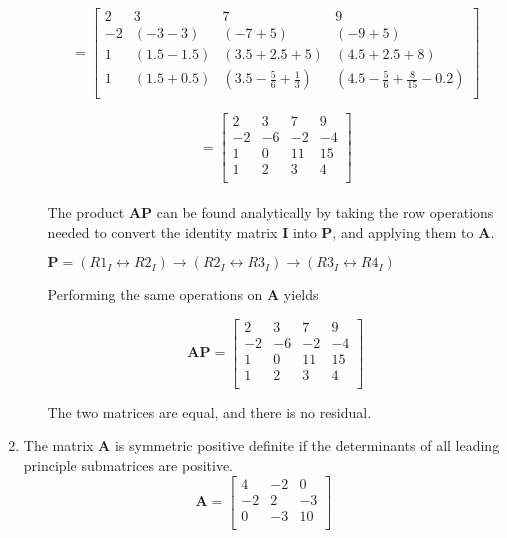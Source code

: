 \documentclass[11pt]{article}
\begin{document}
\begin{enumerate}
\begin{enumerate}[(a)]
				\[
					=
					\begin{bmatrix}
						2 & 3 & 7 & 9 \\
						-2 & (-3-3) & (-7+5) & (-9+5) \\
						1 & (1.5-1.5) & (3.5 + 2.5 + 5) & (4.5 + 2.5 + 8) \\
						1 & (1.5 + 0.5) & (3.5 - \frac{5}{6} + \frac{1}{3}) & (4.5 - \frac{5}{6} + \frac{8}{15} -0.2)\\
					\end{bmatrix}
				\]

				\[
					=
					\begin{bmatrix}
						2 & 3 & 7 & 9 \\
						-2 & -6 & -2 & -4 \\
						1 & 0 & 11 & 15 \\
						1 & 2 & 3 & 4 \\
					\end{bmatrix}
				\] \\

				The product $\mathbf{AP}$ can be found analytically by taking the row operations needed to convert the identity
				matrix $\mathbf{I}$ into $\mathbf{P}$, and applying them to $\mathbf{A}$.

				$\mathbf{P} = (R1_I \leftrightarrow R2_I) \to (R2_I \leftrightarrow R3_I) \to (R3_I \leftrightarrow R4_I)$

				Performing the same operations on $\mathbf{A}$ yields

				\[
					\mathbf{AP}=
					\begin{bmatrix}
						2 & 3 & 7 & 9 \\
						-2 & -6 & -2 & -4 \\
						1 & 0 & 11 & 15 \\
						1 & 2 & 3 & 4 \\
					\end{bmatrix}
				\]

				The two matrices are equal, and there is no residual. \\

		\end{enumerate}

	\item The matrix $\mathbf{A}$ is symmetric positive definite if the determinants of all leading principle submatrices are positive.
		\[
			\mathbf{A}=
			\begin{bmatrix}
				4 & -2 & 0 \\
				-2 & 2 & -3 \\
				0 & -3 & 10 \\
			\end{bmatrix}
		\]


\end{enumerate}
\end{document}
